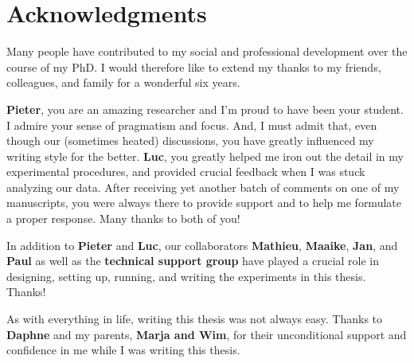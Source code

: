 \clearpage
\pagestyle{empty}

\chapter*{Acknowledgments}
{}

Many people have contributed to my social and professional development over the course of my PhD. I would therefore like to extend my thanks to my friends, colleagues, and family for a wonderful six years.

\textbf{Pieter}, you are an amazing researcher and I'm proud to have been your student. I admire your sense of pragmatism and focus. And, I must admit that, even though our (sometimes heated) discussions, you have greatly influenced my writing style for the better. \textbf{Luc}, you greatly helped me iron out the detail in my experimental procedures, and provided crucial feedback when I was stuck analyzing our data. After receiving yet another batch of comments on one of my manuscripts, you were always there to provide support and to help me formulate a proper response. Many thanks to both of you!

In addition to \textbf{Pieter} and \textbf{Luc}, our collaborators \textbf{Mathieu}, \textbf{Maaike}, \textbf{Jan}, and \textbf{Paul} as well as the \textbf{technical support group} have played a crucial role in designing, setting up, running, and writing the experiments in this thesis. Thanks!

As with everything in life, writing this thesis was not always easy. Thanks to \textbf{Daphne} and my parents, \textbf{Marja and Wim}, for their unconditional support and confidence in me while I was writing this thesis.
